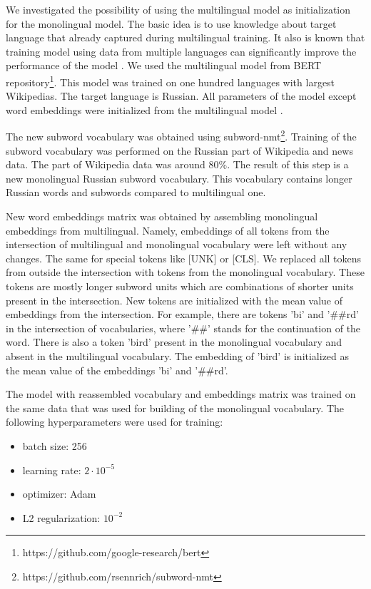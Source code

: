 \documentclass{article}
\begin{document}
We investigated the possibility of using the multilingual model as initialization for the monolingual model. The basic idea is to use knowledge about target language that already captured during multilingual training. It also is known that training model using data from multiple languages can significantly improve the performance of the model \cite{mulcaire2018polyglot}.
We used the multilingual model from BERT repository\footnote{https://github.com/google-research/bert}.
This model was trained on one hundred languages with largest Wikipedias.
The target language is Russian. All parameters of the model except word embeddings were initialized from the multilingual model \cite{mulcaire2018polyglot}. 

The new subword vocabulary was obtained using subword-nmt\footnote{https://github.com/rsennrich/subword-nmt}.
Training of the subword vocabulary was performed on the Russian part of Wikipedia and news data.
The part of Wikipedia data was around 80\%. The result of this step is a new monolingual Russian subword vocabulary. This vocabulary contains longer Russian words and subwords compared to multilingual one.  

New word embeddings matrix was obtained by assembling monolingual embeddings from multilingual. Namely, embeddings of all tokens from the intersection of multilingual and monolingual vocabulary were left without any changes. The same for special tokens like [UNK] or [CLS]. We replaced all tokens from outside the intersection with tokens from the monolingual vocabulary. These tokens are mostly longer subword units which are combinations of shorter units present in the intersection. New tokens are initialized with the mean value of embeddings from the intersection. For example, there are tokens 'bi' and '\#\#rd' in the intersection of vocabularies, where '\#\#' stands for the continuation of the word. There is also a token 'bird' present in the monolingual vocabulary and absent in the multilingual vocabulary. The embedding of 'bird' is initialized as the mean value of the embeddings 'bi' and '\#\#rd'.

The model with reassembled vocabulary and embeddings matrix was trained on the same data that was used for building of the monolingual vocabulary. The following hyperparameters were used for training:
\begin{itemize}
    \item batch size: 256
    \item learning rate: $2 \cdot 10^{-5}$
    \item optimizer: Adam
    \item L2 regularization: $10^{-2}$
\end{itemize}
\end{document}
